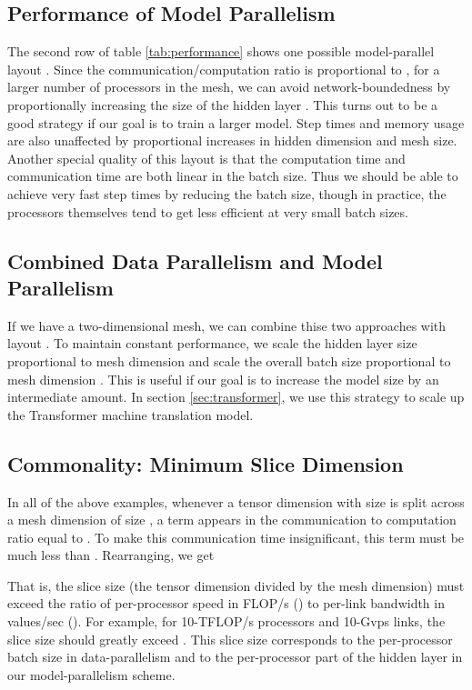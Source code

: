 \documentclass{article}
\begin{document}
\begin{itemize}
\subsection{Performance of Model Parallelism}
The second row of table \ref{tab:performance} shows one possible model-parallel layout .  Since the communication/computation ratio is proportional to  , for a larger number of processors  in the mesh, we can avoid network-boundedness by proportionally increasing the size of the hidden layer .   This turns out to be a good strategy if our goal is to train a larger model.   Step times and memory usage are also unaffected by proportional increases in hidden dimension and mesh size. Another special quality of this layout is that the computation time and communication time are both linear in the batch size.  Thus we should be able to achieve very fast step times by reducing the batch size, though in practice, the processors themselves tend to get less efficient at very small batch sizes.

\subsection{Combined Data Parallelism and Model Parallelism}
If we have a two-dimensional mesh, we can combine thise two approaches with layout .  To maintain constant performance, we scale the hidden layer size  proportional to mesh dimension  and scale the overall batch size proportional to mesh dimension .  This is useful if our goal is to increase the model size by an intermediate amount.  In section \ref{sec:transformer}, we use this strategy to scale up the Transformer machine translation model.



\subsection{Commonality: Minimum Slice Dimension}
In all of the above examples, whenever a tensor dimension with size  is split across a mesh dimension of size , a term appears in the communication to computation ratio equal to .  To make this communication time insignificant, this term must be much less than .  Rearranging, we get

That is, the slice size (the tensor dimension divided by the mesh dimension) must exceed  the ratio of per-processor speed in FLOP/s () to per-link bandwidth in values/sec ().  For example, for 10-TFLOP/s processors and 10-Gvps links, the slice size should greatly exceed .  This slice size corresponds to the per-processor batch size in data-parallelism and to the per-processor part of the hidden layer in our model-parallelism scheme.


\end{itemize}
\end{document}
